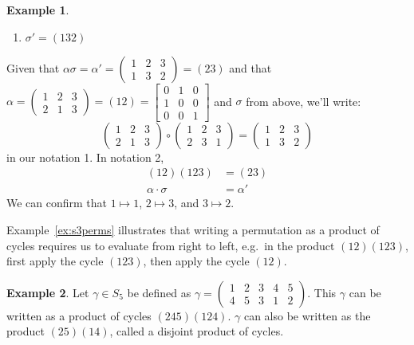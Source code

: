 \documentclass[12pt,letterpaper,DIV=11,final]{scrartcl}
\theoremstyle{plain}
\theoremstyle{definition}
\newtheorem{example}{Example}[section]
\theoremstyle{remark}
\begin{document}
\begin{example}
\begin{multicols}{2}
\begin{enumerate}
      \item $\sigma' = (1 3 2)$
    \end{enumerate}
  \end{multicols}

  Given that $\alpha \sigma = \alpha' = \begin{pmatrix}
    1 & 2 & 3 \\
    1 & 3 & 2
  \end{pmatrix} = (2 3)$ and that $\alpha =
  \begin{pmatrix}
    1 & 2 & 3 \\
    2 & 1 & 3
  \end{pmatrix} = (1 2) =
  \begin{bmatrix}
    0 & 1 & 0 \\
    1 & 0 & 0 \\
    0 & 0 & 1
  \end{bmatrix}$ and $\sigma$ from above, we'll write:
  \begin{displaymath}
    \begin{pmatrix}
      1 & 2 & 3 \\
      2 & 1 & 3
    \end{pmatrix} \circ
    \begin{pmatrix}
      1 & 2 & 3 \\
      2 & 3 & 1
    \end{pmatrix} =
    \begin{pmatrix}
      1 & 2 & 3 \\
      1 & 3 & 2
    \end{pmatrix}
  \end{displaymath}
  in our notation 1.
  In notation 2,
  \begin{align*}
    (1 2) (1 2 3)       &= (2 3) \\
    \alpha \cdot \sigma &= \alpha'
  \end{align*}
  We can confirm that $1 \mapsto 1$, $2 \mapsto 3$, and $3 \mapsto 2$.
\end{example}

Example~\ref{ex:s3perms} illustrates that writing a permutation as a product of cycles requires us to evaluate from right to left, e.g.\ in the product $(1 2)(1 2 3)$,
first apply the cycle $(1 2 3)$, then apply the cycle $(1 2)$.

\begin{example}
  Let $\gamma \in S_5$ be defined as $\gamma = \begin{pmatrix}
    1 & 2 & 3 & 4 & 5 \\
    4 & 5 & 3 & 1 & 2
  \end{pmatrix}$.
  This $\gamma$ can be written as a product of cycles $(2 4 5)(1 2 4)$.
  $\gamma$ can also be written as the product $(2 5)(1 4)$, called a disjoint product of cycles.
\end{example}
\end{document}
